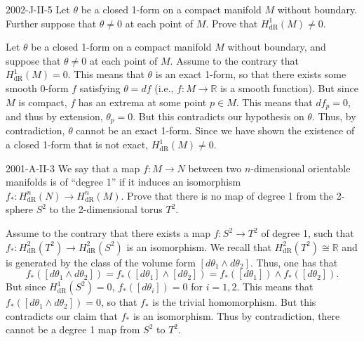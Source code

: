 \documentclass{article}
\begin{document}
	\begin{prb}{2002-J-II-5}
		Let $\theta$ be a closed 1-form on a compact manifold $M$ without boundary. Further suppose that $\theta \neq 0$ at each point of $M$. Prove that $H^{1}_{\text{dR}}(M) \neq 0$. 
	\end{prb}
	Let $\theta$ be a closed 1-form on a compact manifold $M$ without boundary, and suppose that $\theta \neq 0$ at each point of $M$. Assume to the contrary that $H^{1}_{\text{dR}}(M) = 0$. This means that $\theta$ is an exact 1-form, so that there exists some smooth 0-form $f$ satisfying $\theta = df$ (i.e., $f: M \to \mathbb{R}$ is a smooth function). But since $M$ is compact, $f$ has an extrema at some point $p \in M$. This means that $df_{p} = 0$, and thus by extension, $\theta_{p} = 0$. But this contradicts our hypothesis on $\theta$. Thus, by contradiction, $\theta$ cannot be an exact 1-form. Since we have shown the existence of a closed 1-form that is not exact, $H^{1}_{\text{dR}}(M) \neq 0$. 
	
	\begin{prb}{2001-A-II-3}
		We say that a map $f: M \to N$ between two $n$-dimensional orientable manifolds is of ``degree 1'' if it induces an isomorphism $f_{\ast}: H^{n}_{\text{dR}}(N) \to H^{n}_{\text{dR}}(M)$. Prove that there is no map of degree 1 from the 2-sphere $S^{2}$ to the 2-dimensional torus $T^{2}$.
	\end{prb}
	Assume to the contrary that there exists a map $f: S^{2} \to T^{2}$ of degree 1, such that $f_{\ast}: H^{2}_{\text{dR}}(T^{2}) \to H^{2}_{\text{dR}}(S^{2})$ is an isomorphism. We recall that $H^{2}_{\text{dR}}(T^{2}) \cong \mathbb{R}$ and is generated by the class of the volume form $[d\theta_{1} \wedge d\theta_{2}]$. Thus, one has that 
	\begin{equation*}
		f_{\ast}([d\theta_{1} \wedge d\theta_{2}]) = f_{\ast}([d\theta_{1}] \wedge [d\theta_{2}]) = f_{\ast}([d\theta_{1}]) \wedge f_{\ast}([d\theta_{2}]). 
	\end{equation*}
	But since $H^{1}_{\text{dR}}(S^{2}) = 0$, $f_{\ast}([d\theta_{i}]) = 0$ for $i = 1, 2$. This means that $f_{\ast}([d\theta_{1}\wedge d\theta_{2}]) = 0$, so that $f_{\ast}$ is the trivial homomorphism. But this contradicts our claim that $f_{\ast}$ is an isomorphism. Thus by contradiction, there cannot be a degree 1 map from $S^{2}$ to $T^{2}$. 
	
\end{document}
